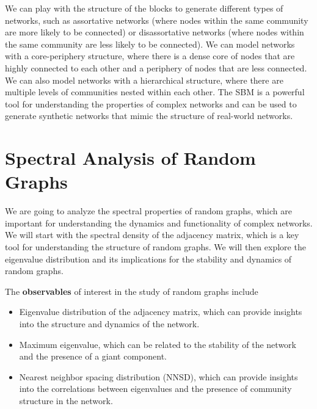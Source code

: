 We can play with the structure of the blocks to generate different types of networks, such as assortative networks (where nodes within the same community are more likely to be connected) or disassortative networks (where nodes within the same community are less likely to be connected). We can model networks with a core-periphery structure, where there is a dense core of nodes that are highly connected to each other and a periphery of nodes that are less connected. We can also model networks with a hierarchical structure, where there are multiple levels of communities nested within each other. The SBM is a powerful tool for understanding the properties of complex networks and can be used to generate synthetic networks that mimic the structure of real-world networks.









\chapter{Spectral Analysis of Random Graphs}

We are going to analyze the spectral properties of random graphs, which are important for understanding the dynamics and functionality of complex networks. We will start with the spectral density of the adjacency matrix, which is a key tool for understanding the structure of random graphs. We will then explore the eigenvalue distribution and its implications for the stability and dynamics of random graphs.

The \textbf{observables} of interest in the study of random graphs include
\begin{itemize}
    \item Eigenvalue distribution of the adjacency matrix, which can provide insights into the structure and dynamics of the network.
    \item Maximum eigenvalue, which can be related to the stability of the network and the presence of a giant component.
    \item Nearest neighbor spacing distribution (NNSD), which can provide insights into the correlations between eigenvalues and the presence of community structure in the network.
\end{itemize}

